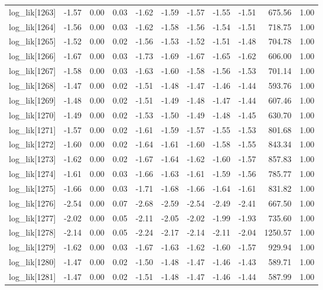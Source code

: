 \begin{table}[ht]
\begin{tabular}{rrrrrrrrrrr}
  log\_lik[1263] & -1.57 & 0.00 & 0.03 & -1.62 & -1.59 & -1.57 & -1.55 & -1.51 & 675.56 & 1.00 \\ 
  log\_lik[1264] & -1.56 & 0.00 & 0.03 & -1.62 & -1.58 & -1.56 & -1.54 & -1.51 & 718.75 & 1.00 \\ 
  log\_lik[1265] & -1.52 & 0.00 & 0.02 & -1.56 & -1.53 & -1.52 & -1.51 & -1.48 & 704.78 & 1.00 \\ 
  log\_lik[1266] & -1.67 & 0.00 & 0.03 & -1.73 & -1.69 & -1.67 & -1.65 & -1.62 & 606.00 & 1.00 \\ 
  log\_lik[1267] & -1.58 & 0.00 & 0.03 & -1.63 & -1.60 & -1.58 & -1.56 & -1.53 & 701.14 & 1.00 \\ 
  log\_lik[1268] & -1.47 & 0.00 & 0.02 & -1.51 & -1.48 & -1.47 & -1.46 & -1.44 & 593.76 & 1.00 \\ 
  log\_lik[1269] & -1.48 & 0.00 & 0.02 & -1.51 & -1.49 & -1.48 & -1.47 & -1.44 & 607.46 & 1.00 \\ 
  log\_lik[1270] & -1.49 & 0.00 & 0.02 & -1.53 & -1.50 & -1.49 & -1.48 & -1.45 & 630.70 & 1.00 \\ 
  log\_lik[1271] & -1.57 & 0.00 & 0.02 & -1.61 & -1.59 & -1.57 & -1.55 & -1.53 & 801.68 & 1.00 \\ 
  log\_lik[1272] & -1.60 & 0.00 & 0.02 & -1.64 & -1.61 & -1.60 & -1.58 & -1.55 & 843.34 & 1.00 \\ 
  log\_lik[1273] & -1.62 & 0.00 & 0.02 & -1.67 & -1.64 & -1.62 & -1.60 & -1.57 & 857.83 & 1.00 \\ 
  log\_lik[1274] & -1.61 & 0.00 & 0.03 & -1.66 & -1.63 & -1.61 & -1.59 & -1.56 & 785.77 & 1.00 \\ 
  log\_lik[1275] & -1.66 & 0.00 & 0.03 & -1.71 & -1.68 & -1.66 & -1.64 & -1.61 & 831.82 & 1.00 \\ 
  log\_lik[1276] & -2.54 & 0.00 & 0.07 & -2.68 & -2.59 & -2.54 & -2.49 & -2.41 & 667.50 & 1.00 \\ 
  log\_lik[1277] & -2.02 & 0.00 & 0.05 & -2.11 & -2.05 & -2.02 & -1.99 & -1.93 & 735.60 & 1.00 \\ 
  log\_lik[1278] & -2.14 & 0.00 & 0.05 & -2.24 & -2.17 & -2.14 & -2.11 & -2.04 & 1250.57 & 1.00 \\ 
  log\_lik[1279] & -1.62 & 0.00 & 0.03 & -1.67 & -1.63 & -1.62 & -1.60 & -1.57 & 929.94 & 1.00 \\ 
  log\_lik[1280] & -1.47 & 0.00 & 0.02 & -1.50 & -1.48 & -1.47 & -1.46 & -1.43 & 589.71 & 1.00 \\ 
  log\_lik[1281] & -1.47 & 0.00 & 0.02 & -1.51 & -1.48 & -1.47 & -1.46 & -1.44 & 587.99 & 1.00 \\ 

\end{tabular}
\end{table}
